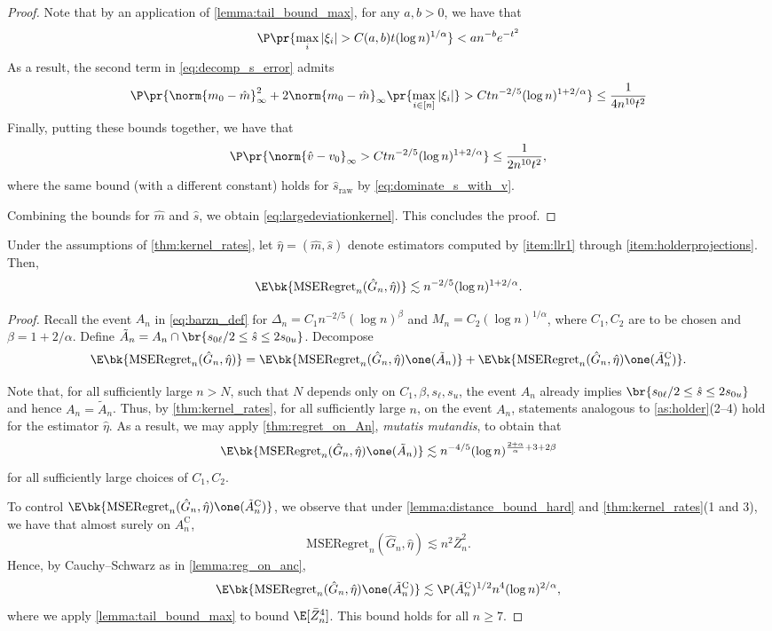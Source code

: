 \documentclass[12pt, reqno]{amsart}
\newcommand{\raw}{\mathrm{raw}}
\newcommand{\hatm}{\hat m}
\newcommand{\hats}{\hat s}
\newcommand{\hateta}{\hat\eta}
\newcommand{\reg}{\mathrm{MSERegret}_n}
\newcommand{\comp}{\mathrm{C}}
\numberwithin{equation}{section}
\begin{document}
\begin{refsection}
\begin{appendices}
\begin{proof}
Note that by an application of \cref{lemma:tail_bound_max}, for any $a, b> 0$, we have
that \[
\P\pr{
  \max_{i} |\xi_i| > C(a,b)t (\log n)^{1/\alpha}
} < an^{-b} e^{-t^2}
\]
As a result, the second term in \eqref{eq:decomp_s_error} admits \[
\P\pr{
\norm{m_0
- \hatm}_\infty^2  + 2 \norm{m_0 - \hat m}_\infty
\pr{\max_{i\in[n]} |\xi_i|} > C t n^{-2/5} (\log n)^{1+2/\alpha}
} \le \frac{1}{4 n^{10}t^2}
\]
Finally, putting these bounds together, we have that \[
\P\pr{
  \norm{\hat v - v_0}_\infty > C tn^{-2/5} (\log n)^{1+2/\alpha}
} \le \frac{1}{2n^{10}t^2},
\]
where the same bound (with a different constant) holds for $\hats_\raw$ by
\eqref{eq:dominate_s_with_v}.

Combining the bounds for $\hatm$ and $\hats$, we obtain \eqref{eq:largedeviationkernel}.
This concludes the proof.
\end{proof}


\begin{theorem}
\label{thm:llr_main_regret}
Under the assumptions of \cref{thm:kernel_rates}, let $\hateta = (\hatm, \hats)$ denote
   estimators computed by \cref{item:llr1} through \cref{item:holderprojections}. Then, \[
\E\bk{\reg(\hat G_n, \hateta)} \lesssim n^{-2/5} (\log n)^{1+2/\alpha}.
   \]
\end{theorem}

\begin{proof}
Recall the event $A_n$ in \eqref{eq:barzn_def} for $\Delta_n = C_1 n^{-2/5} (\log
n)^\beta$ and $M_n = C_2 (\log n)^{1/\alpha}$, where $C_1, C_2$ are to be chosen and
$\beta = 1+2/\alpha$. Define $\tilde A_n = A_n \cap \br{s_{0\ell}/2 \le \hat s \le 2s_
{0u}}$.
Decompose \[
\E\bk{\reg(\hat G_n, \hateta)} = \E\bk{\reg(\hat G_n, \hateta) \one(\tilde A_n)} + \E\bk{\reg
(\hat G_n, \hateta)\one(\tilde A_n^\comp)}.
\]

Note that, for all sufficiently large $n > N$, such that $N$ depends only on $C_1, \beta,
s_\ell, s_u$, the event $A_n$ already implies $\br{s_{0\ell}/2 \le \hat s \le 2s_{0u}}$
and hence
$A_n = \tilde A_n$. Thus, by
\cref{thm:kernel_rates}, for all sufficiently large $n$,  on the event $A_n$,
statements analogous to \cref{as:holder}(2--4) hold for the
estimator $\hateta$. As a result, we may apply \cref{thm:regret_on_An}, \emph{mutatis
mutandis}, to obtain that \[
\E\bk{\reg(\hat G_n, \hateta) \one(\tilde A_n)} \lesssim n^{-4/5} (\log n)^{
\frac{2+\alpha}
{\alpha} + 3 + 2\beta}
\]
for all sufficiently large choices of $C_1, C_2$.

To control $\E\bk{\reg
(\hat G_n, \hateta)\one(\tilde A_n^\comp)}$, we observe that under
\cref{lemma:distance_bound_hard} and \cref{thm:kernel_rates}(1 and 3), we have that almost
surely on $A_n^\comp$, \[
\reg(\hat G_n, \hateta) \lesssim n^{2} \bar Z_n^2.
\]
Hence, by Cauchy--Schwarz as in \cref{lemma:reg_on_anc}, \[
\E\bk{\reg
(\hat G_n, \hateta)\one(\tilde A_n^\comp)} \lesssim \P(\tilde A_n^{\comp})^{1/2} n^4
(\log n
)^{2/\alpha},
\]
where we apply \cref{lemma:tail_bound_max} to bound $\E[\bar Z_n^4]$. This bound holds for
all $n \ge 7$. 


\end{proof}
\end{appendices}
\end{refsection}
\end{document}
